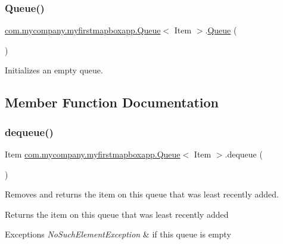 \subsubsection{\texorpdfstring{Queue()}{Queue()}}
{\footnotesize\ttfamily \hyperlink{classcom_1_1mycompany_1_1myfirstmapboxapp_1_1_queue}{com.\+mycompany.\+myfirstmapboxapp.\+Queue}$<$ Item $>$.\hyperlink{classcom_1_1mycompany_1_1myfirstmapboxapp_1_1_queue}{Queue} (\begin{DoxyParamCaption}{ }\end{DoxyParamCaption})\hspace{0.3cm}{\ttfamily [inline]}}

Initializes an empty queue. 

\subsection{Member Function Documentation}
\mbox{\label{classcom_1_1mycompany_1_1myfirstmapboxapp_1_1_queue_a37c8b702019bda3297814a8ee452345f}} 
\subsubsection{\texorpdfstring{dequeue()}{dequeue()}}
{\footnotesize\ttfamily Item \hyperlink{classcom_1_1mycompany_1_1myfirstmapboxapp_1_1_queue}{com.\+mycompany.\+myfirstmapboxapp.\+Queue}$<$ Item $>$.dequeue (\begin{DoxyParamCaption}{ }\end{DoxyParamCaption})\hspace{0.3cm}{\ttfamily [inline]}}

Removes and returns the item on this queue that was least recently added.

\begin{DoxyReturn}{Returns}
the item on this queue that was least recently added 
\end{DoxyReturn}

\begin{DoxyExceptions}{Exceptions}
{\em No\+Such\+Element\+Exception} & if this queue is empty \\
\hline
\end{DoxyExceptions}
\mbox{\label{classcom_1_1mycompany_1_1myfirstmapboxapp_1_1_queue_a2c341b688fd1aaffe67ac1d1803e908b}} 
